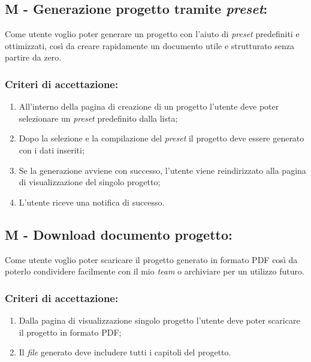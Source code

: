 \subsection*{M - Generazione progetto tramite \textit{preset}:}

\noindent Come utente voglio poter generare un progetto con l'aiuto di \textit{preset} predefiniti e ottimizzati, così da creare rapidamente un documento utile e strutturato senza partire da zero.

\subsubsection*{Criteri di accettazione:}

\begin{enumerate}
    \item All’interno della pagina di creazione di un progetto l'utente deve poter selezionare un \textit{preset} predefinito dalla lista;
    \item Dopo la selezione e la compilazione del \textit{preset} il progetto deve essere generato con i dati inseriti;
    \item Se la generazione avviene con successo, l’utente viene reindirizzato alla pagina di visualizzazione del singolo progetto;
    \item L’utente riceve una notifica di successo.
\end{enumerate}

\vspace{0.2cm}

\subsection*{M - Download documento progetto:}

\noindent Come utente voglio poter scaricare il progetto generato in formato PDF così da poterlo condividere facilmente con il mio \textit{team} o archiviare per un utilizzo futuro.

\subsubsection*{Criteri di accettazione:}

\begin{enumerate}
    \item Dalla pagina di visualizzazione singolo progetto l'utente deve poter scaricare il progetto in formato PDF;
    \item Il \textit{file} generato deve includere tutti i capitoli del progetto.
\end{enumerate}

